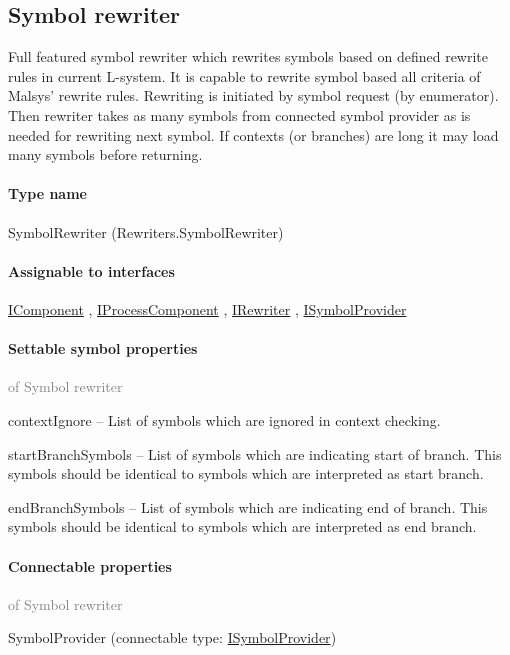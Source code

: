 \subsection{Symbol rewriter}
\label{Malsys.Processing.Components.Rewriters.SymbolRewriter}
Full featured symbol rewriter which rewrites symbols based on defined rewrite rules in current L-system.
            It is capable to rewrite symbol based all criteria of Malsys' rewrite rules.
            Rewriting is initiated by symbol request (by enumerator).
            Then rewriter takes as many symbols from connected symbol provider as is needed for rewriting next symbol.
            If contexts (or branches) are long it may load many symbols before returning.\paragraph{Type name}
SymbolRewriter (Rewriters.SymbolRewriter) 	\paragraph{Assignable to interfaces}
		\hyperref[Malsys.Processing.Components.IComponent]{IComponent}%
, 		\hyperref[Malsys.Processing.Components.IProcessComponent]{IProcessComponent}%
, 		\hyperref[Malsys.Processing.Components.IRewriter]{IRewriter}%
, 		\hyperref[Malsys.Processing.Components.ISymbolProvider]{ISymbolProvider}%
	\paragraph{Settable symbol properties}\textcolor{gray}{of Symbol rewriter}
	\begin{description*}
		\item[contextIgnore]
			-- List of symbols which are ignored in context checking.
		\item[startBranchSymbols]
			-- List of symbols which are indicating start of branch.
            This symbols should be identical to symbols which are interpreted as start branch.
		\item[endBranchSymbols]
			-- List of symbols which are indicating end of branch.
            This symbols should be identical to symbols which are interpreted as end branch.
	\end{description*}
	\paragraph{Connectable properties}\textcolor{gray}{of Symbol rewriter}
	\begin{description*}
		\item[SymbolProvider]
		(connectable type:  \hyperref[Malsys.Processing.Components.ISymbolProvider]{ISymbolProvider})
	\end{description*}
	
